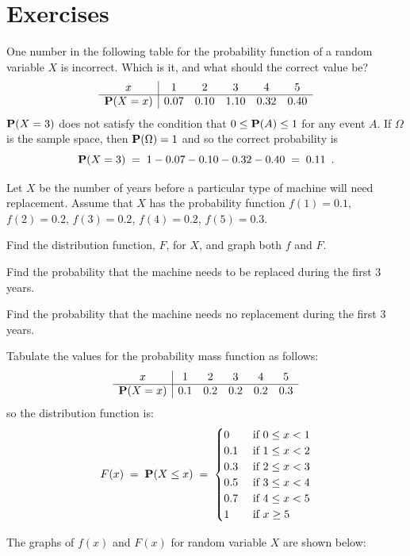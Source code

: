 \newpage
\section*{Exercises}

\begin{ExerciseList}
\Exercise
One number in the following table for the probability function of a random variable $X$ is incorrect.  
Which is it, and what should the correct value be?
$$
\begin{array}{c|ccccc}
x&1&2&3&4&5\\\hline
\mathbf{P}(X=x)&0.07&0.10&1.10&0.32&0.40
\end{array}
$$
\Answer
$\mathbf{P}(X=3)$ does not satisfy the condition that $0\leq \mathbf{P}(A)\leq1$ for any event $A$.  
If $\Omega$ is the sample space, then $\mathbf{P}(\Omega)=1$ and so  the correct probability is 
\[
\mathbf{P}(X=3)\;=\;1-0.07-0.10-0.32-0.40\;=\;0.11 \enspace .
\]

\Exercise
Let $X$ be the number of years before a particular type of machine will need replacement.  
Assume that $X$ has the probability function $f(1)=0.1$, $f(2)=0.2$, $f(3)=0.2$, $f(4)=0.2$, $f(5)=0.3$.
\be
\item Find the distribution
  function, $F$,  for $X$, and graph both $f$ and $F$.

\item  Find the probability that the machine needs to be
  replaced during the first 3 years.

\item  Find the probability that the machine needs no
  replacement during the first 3 years.
\ee
\Answer
\be
\item  Tabulate the values for the probability mass function  as follows: $$
\begin{array}{c|ccccc}
x&1&2&3&4&5\\\hline
\mathbf{P}(X=x)&0.1&0.2&0.2&0.2&0.3
\end{array}
$$so the  distribution function is:
\[F(x)\; = \;\mathbf{P}(X \leq x) \;=\;
\begin{cases}
 0 & \text{ if }  0 \leq   x < 1\\
 0.1 & \text{ if } 1 \leq  x < 2\\
0.3 & \text{ if } 2 \leq x < 3\\
 0.5 & \text{ if } 3 \leq x < 4\\
0.7 & \text{ if }  4 \leq x < 5\\
 1& \text{ if }    x \geq 5
\end{cases}
\]

The graphs of $f(x)$ and $F(x)$ for random variable $X$ are shown below:


\end{ExerciseList}
